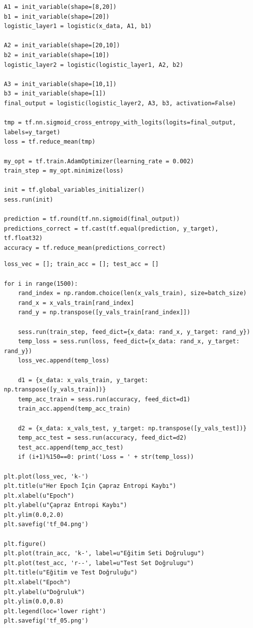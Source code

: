 \documentclass[12pt,fleqn]{article}\usepackage{../../common}
\begin{document}
\begin{verbatim}
A1 = init_variable(shape=[8,20])
b1 = init_variable(shape=[20])
logistic_layer1 = logistic(x_data, A1, b1)

A2 = init_variable(shape=[20,10])
b2 = init_variable(shape=[10])
logistic_layer2 = logistic(logistic_layer1, A2, b2)

A3 = init_variable(shape=[10,1])
b3 = init_variable(shape=[1])
final_output = logistic(logistic_layer2, A3, b3, activation=False)

tmp = tf.nn.sigmoid_cross_entropy_with_logits(logits=final_output, labels=y_target)
loss = tf.reduce_mean(tmp)
     
my_opt = tf.train.AdamOptimizer(learning_rate = 0.002)
train_step = my_opt.minimize(loss)

init = tf.global_variables_initializer()
sess.run(init)

prediction = tf.round(tf.nn.sigmoid(final_output))
predictions_correct = tf.cast(tf.equal(prediction, y_target), tf.float32)
accuracy = tf.reduce_mean(predictions_correct)
\end{verbatim}

\begin{verbatim}
loss_vec = []; train_acc = []; test_acc = []

for i in range(1500):
    rand_index = np.random.choice(len(x_vals_train), size=batch_size)
    rand_x = x_vals_train[rand_index]
    rand_y = np.transpose([y_vals_train[rand_index]])

    sess.run(train_step, feed_dict={x_data: rand_x, y_target: rand_y})
    temp_loss = sess.run(loss, feed_dict={x_data: rand_x, y_target: rand_y})
    loss_vec.append(temp_loss)

    d1 = {x_data: x_vals_train, y_target: np.transpose([y_vals_train])}
    temp_acc_train = sess.run(accuracy, feed_dict=d1)
    train_acc.append(temp_acc_train)

    d2 = {x_data: x_vals_test, y_target: np.transpose([y_vals_test])}
    temp_acc_test = sess.run(accuracy, feed_dict=d2)
    test_acc.append(temp_acc_test)
    if (i+1)%150==0: print('Loss = ' + str(temp_loss))

plt.plot(loss_vec, 'k-')
plt.title(u"Her Epoch İçin Çapraz Entropi Kaybı")
plt.xlabel(u"Epoch")
plt.ylabel(u"Çapraz Entropi Kaybı")
plt.ylim(0.0,2.0)
plt.savefig('tf_04.png')        

plt.figure()
plt.plot(train_acc, 'k-', label=u"Eğitim Seti Doğrulugu")
plt.plot(test_acc, 'r--', label=u"Test Set Doğrulugu")
plt.title(u"Eğitim ve Test Doğruluğu")
plt.xlabel("Epoch")
plt.ylabel(u"Doğruluk")
plt.ylim(0.0,0.8)
plt.legend(loc='lower right')
plt.savefig('tf_05.png')        
\end{verbatim}
\end{document}
